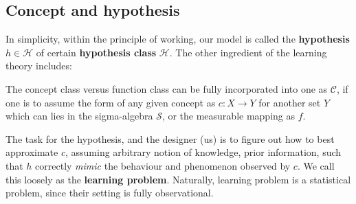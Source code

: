 
\subsection{Concept and hypothesis}

In simplicity, within the principle of working, our model is called the \textbf{hypothesis} $h\in \mathcal{H}$ of certain \textbf{hypothesis class} $\mathcal{H}$. The other ingredient of the learning theory includes: 

The concept class versus function class can be fully incorporated into one as $\mathcal{C}$, if one is to assume the form of any given concept as $c: X\to Y$ for another set $Y$ which can lies in the sigma-algebra $\mathcal{S}$, or the measurable mapping as $f$. 

The task for the hypothesis, and the designer (us) is to figure out how to best approximate $c$, assuming arbitrary notion of knowledge, prior information, such that $h$ correctly \textit{mimic} the behaviour and phenomenon observed by $c$. We call this loosely as the \textbf{learning problem}. Naturally, learning problem is a statistical problem, since their setting is fully observational. 

